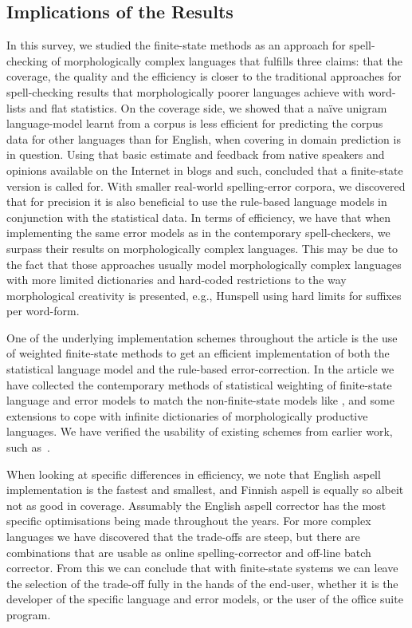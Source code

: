 \documentclass[a4paper,12pt]{article}
\begin{document}
\subsection{Implications of the Results}

In this survey, we studied the finite-state methods as an approach for
spell-checking of morphologically complex languages that fulfills three claims:
that the coverage, the quality and the efficiency is closer to the traditional
approaches for spell-checking results that morphologically poorer languages
achieve with word-lists and flat statistics. On the coverage side, we showed
that a naïve unigram language-model learnt from a corpus is less efficient for
predicting the corpus data for other languages than for English, when covering
in domain prediction is in question. Using that basic estimate and feedback
from native speakers and opinions available on the Internet in blogs and such,
concluded that a finite-state version is called for. With smaller real-world
spelling-error corpora, we discovered that for precision it is also beneficial
to use the rule-based language models in conjunction with the statistical data.
In terms of efficiency, we have  that when implementing the same error models
as in the contemporary spell-checkers, we surpass their results on
morphologically complex languages.  This may be due to the fact that those
approaches usually model morphologically complex languages with more limited
dictionaries and hard-coded restrictions to the way morphological creativity is
presented, e.g., Hunspell using hard limits for suffixes per word-form.

One of the underlying implementation schemes throughout the article is the use
of weighted finite-state methods to get an efficient implementation of both the
statistical language model and the rule-based error-correction. In the article
we have collected the contemporary methods of statistical weighting of
finite-state language and error models to match the non-finite-state models
like \cite{church1991probability}, and some extensions to cope with infinite
dictionaries of morphologically productive languages. We have verified the
usability of existing schemes from earlier work, such
as~\cite{pirinen/2009/nodalida,pirinen/2010/lrec}.

When looking at specific differences in efficiency, we note that English aspell
implementation is the fastest and smallest, and Finnish aspell is equally so
albeit not as good in coverage. Assumably the English aspell corrector has the
most specific optimisations being made throughout the years. For more complex
languages we have discovered that the trade-offs are steep, but there are
combinations that are usable as online spelling-corrector and off-line batch
corrector.  From this we can conclude that with finite-state systems we can
leave the selection of the trade-off fully in the hands of the end-user,
whether it is the developer of the specific language and error models, or the
user of the office suite program.
\end{document}
